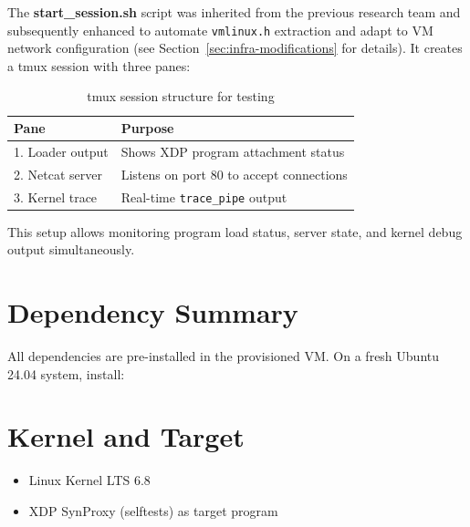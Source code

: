 \noindent The \textbf{start\_session.sh} script was inherited from the previous research team and subsequently enhanced to automate \texttt{vmlinux.h} extraction and adapt to VM network configuration (see Section~\ref{sec:infra-modifications} for details). It creates a tmux session with three panes:

\begin{table}[h]
\centering
\begin{tabular}{|l|l|}
\hline
\textbf{Pane} & \textbf{Purpose} \\
\hline
1. Loader output & Shows XDP program attachment status \\
2. Netcat server & Listens on port 80 to accept connections \\
3. Kernel trace & Real-time \texttt{trace\_pipe} output \\
\hline
\end{tabular}
\caption{tmux session structure for testing}
\end{table}

This setup allows monitoring program load status, server state, and kernel debug output simultaneously.

\section{Dependency Summary}

All dependencies are pre-installed in the provisioned VM. On a fresh Ubuntu 24.04 system, install:

\vspace{0.3cm}
\noindent
{}
\vspace{0.3cm}
\section{Kernel and Target}
\begin{itemize}
  \item Linux Kernel LTS 6.8
  \item XDP SynProxy (selftests) as target program
\end{itemize}

